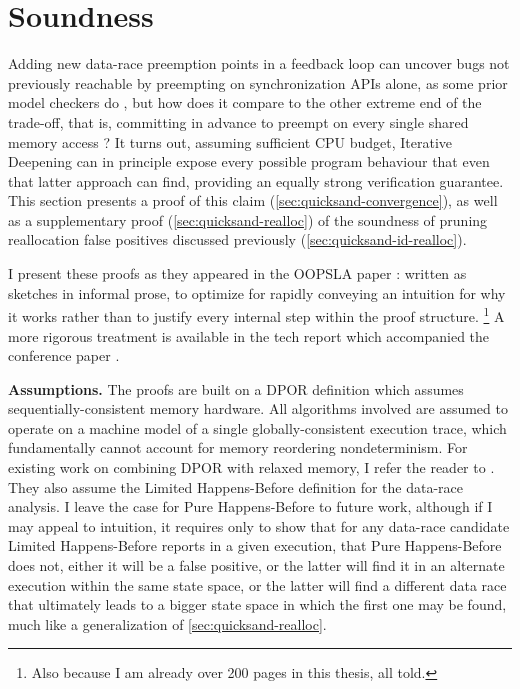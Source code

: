 
\section{Soundness}
\label{sec:quicksand-soundness}

Adding new data-race preemption points in a feedback loop can uncover bugs
not previously reachable by preempting on synchronization APIs alone,
as some prior model checkers do \cite{dbug-ssv},
but how does it compare to the other extreme end of the trade-off,
that is,
committing in advance to preempt on every single shared memory access \cite{spin,inspect}?
It turns out,
assuming sufficient CPU budget,
Iterative Deepening can in principle expose every possible program behaviour that
even that latter approach can find,
providing an equally strong verification guarantee.
This section presents a proof of this claim (\cref{sec:quicksand-convergence}),
as well as a supplementary proof (\cref{sec:quicksand-realloc})
of the soundness of pruning reallocation false positives discussed previously (\cref{sec:quicksand-id-realloc}).

I present these proofs as they appeared in the OOPSLA paper \cite{quicksand}:
written as sketches in informal prose,
to optimize for rapidly conveying an intuition for why it works
rather than to justify every internal step within the proof structure.%
\footnote{Also because I am already over 200 pages in this thesis, all told.}
A more rigorous treatment
is available in the tech report which accompanied the conference paper \cite{quicksand-soundness}.

{\bf Assumptions.}
The proofs are built on a DPOR definition which assumes sequentially-consistent memory hardware.
All algorithms involved are assumed to operate on a machine model of a single globally-consistent execution trace,
which fundamentally cannot account for memory reordering nondeterminism.
For existing work on combining DPOR with relaxed memory, I refer the reader to \cite{tsopso}.
They also assume the Limited Happens-Before definition
for the data-race analysis.
I leave the case for Pure Happens-Before to future work,
although if I may appeal to intuition,
it requires only to show that for any data-race candidate
Limited Happens-Before reports in a given execution,
that Pure Happens-Before does not,
either it will be a false positive,
or the latter will find it in an alternate execution within the same state space,
or the latter will find a different data race that ultimately leads to a bigger state space in which the first one may be found,
much like a generalization of \cref{sec:quicksand-realloc}.

